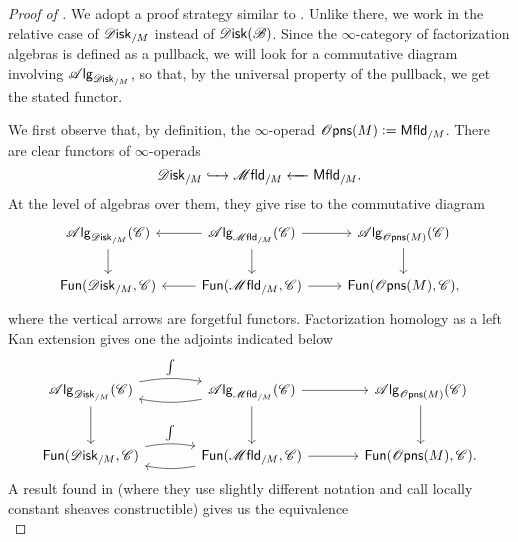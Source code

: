 \documentclass[../text]{subfiles}
\begin{document}
\begin{proof}[Proof of {}]
    We adopt a proof strategy similar to \cite[prop.3.14]{af_primer}. Unlike there, we work in the relative case of $\disk_{/M}$ instead of $\disk(\bstr)$. Since the $\infty$-category of factorization algebras is defined as a pullback, we will look for a commutative diagram involving $\alg{\disk_{/M}}$, so that, by the universal property of the pullback, we get the stated functor.
    
    We first observe that, by definition, the $\infty$-operad $\opens(M) := \mfld[r]_{/M}$. There are clear functors of $\infty$-operads
    \begin{equation}
        \disk_{/M} \xhookrightarrow{\ \ \ } \mfld_{/M} \xleftarrow{\ \ \ } \mfld[r]_{/M}.
    \end{equation}
    At the level of algebras over them, they give rise to the commutative diagram
    \begin{equation}
        \begin{tikzcd}
            \alg{\disk_{/M}} (\catC) \arrow[d] & \alg{\mfld_{/M}} (\catC) \arrow[l] \arrow[r] \arrow[d] & \alg{\opens(M)} (\catC) \arrow[d] \\
            \mathsf{Fun}(\disk_{/M}, \catC) & \mathsf{Fun}(\mfld_{/M}, \catC) \arrow[l] \arrow[r] & \mathsf{Fun}(\opens(M), \catC),
        \end{tikzcd}
    \end{equation}
    where the vertical arrows are forgetful functors. Factorization homology as a left Kan extension gives one the adjoints indicated below
    \begin{equation}
        \begin{tikzcd}[row sep = large, column sep = large]
            \alg{\disk_{/M}} (\catC) \arrow[r, bend left=10, "\int"] \arrow[d] & \alg{\mfld_{/M}} (\catC) \arrow[l, bend left=10] \arrow[r] \arrow[d] & \alg{\opens(M)} (\catC) \arrow[d] \\
            \mathsf{Fun}(\disk_{/M}, \catC) \arrow[r, bend left=10, "\int"] & \mathsf{Fun}(\mfld_{/M}, \catC) \arrow[l, bend left=10] \arrow[r] & \mathsf{Fun}(\opens(M), \catC).
        \end{tikzcd}
    \end{equation}
    A result found in \cite[thm.1.2.5]{aft_localstrut} (where they use slightly different notation and call locally constant sheaves constructible) gives us the equivalence
    \begin{equation}

\end{equation}
\end{proof}
\end{document}
